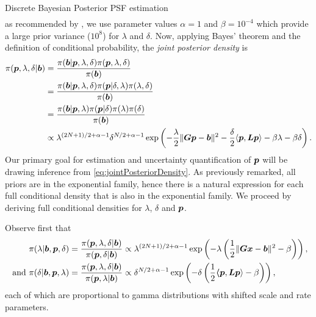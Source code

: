 \begin{chapter}{Discrete Bayesian Posterior PSF estimation}
\begin{align}
\end{align}
as recommended by \citep{higdon2006primer}, we use parameter values $\alpha = 1$ and $\beta =  10^{-4}$ which provide a large prior variance ($10^8$) for $\lambda$ and $\delta$. 
Now, applying Bayes' theorem and the definition of conditional probability, the \emph{joint posterior density} is
\begin{align}
\pi(\mbox{\boldmath$p$},\lambda,\delta|\mbox{\boldmath$b$}) 
&= \frac{\pi(\mbox{\boldmath$b$}|\mbox{\boldmath$p$},\lambda,\delta) \pi(\mbox{\boldmath$p$},\lambda,\delta)}{\pi(\mbox{\boldmath$b$})} \nonumber \\
&= \frac{\pi(\mbox{\boldmath$b$}|\mbox{\boldmath$p$},\lambda,\delta) \pi(\mbox{\boldmath$p$}| \delta,\lambda) \pi(\lambda,\delta)}{\pi(\mbox{\boldmath$b$})} \nonumber \\
&= \frac{\pi(\mbox{\boldmath$b$}|\mbox{\boldmath$p$},\lambda) \pi(\mbox{\boldmath$p$}| \delta) \pi(\lambda)\pi(\delta)}{\pi(\mbox{\boldmath$b$})} \nonumber \\
&\propto \lambda^{(2N+1)/2+\alpha-1}\delta^{N/2+\alpha-1} \exp\left(-\frac{\lambda}{2}\|\mbox{\boldmath$Gp$} - \mbox{\boldmath$b$}\|^2 - \frac{\delta}{2}\langle \mbox{\boldmath$p$}, \mbox{\boldmath$L$} \mbox{\boldmath$p$}\rangle - \beta\lambda - \beta\delta \right). \label{eq:jointPosteriorDensity}
\end{align}
Our primary goal for estimation and uncertainty quantification of $\mbox{\boldmath$p$}$ will be drawing inference from \eqref{eq:jointPosteriorDensity}.
As previously remarked, all priors are in the exponential family, hence there is a natural expression for each full conditional density that is also in the exponential family.
We proceed by deriving full conditional densities for $\lambda$, $\delta$ and $\mbox{\boldmath$p$}$.

Observe first that
\begin{align}
  \pi(\lambda| \mbox{\boldmath$b$},\mbox{\boldmath$p$},\delta) 
  &= \frac{\pi(\mbox{\boldmath$p$},\lambda,\delta|\mbox{\boldmath$b$})}{\pi(\mbox{\boldmath$p$},\delta|\mbox{\boldmath$b$}) } 
  \propto \lambda^{(2N+1)/2+\alpha-1}\exp\left(-\lambda\left(\frac{1}{2}\|\mbox{\boldmath$Gx$} - \mbox{\boldmath$b$}\|^2 - \beta\right)  \right), \nonumber\\
\text{ and }\pi(\delta| \mbox{\boldmath$b$},\mbox{\boldmath$p$},\lambda) 
  &= \frac{\pi(\mbox{\boldmath$p$},\lambda,\delta|\mbox{\boldmath$b$})}{\pi(\mbox{\boldmath$p$},\lambda|\mbox{\boldmath$b$}) } 
  \propto \delta^{N/2+\alpha-1}\exp\left(-\delta\left(\frac{1}{2}\mbox{\boldmath$\langle$} \mbox{\boldmath$p$},\mbox{\boldmath$L$}\mbox{\boldmath$p$} \rangle- \beta\right)  \right), \label{eq:lambdaDeltaConditional} 
\end{align}
each of which are proportional to gamma distributions with shifted scale and rate parameters.
 

\end{chapter}
